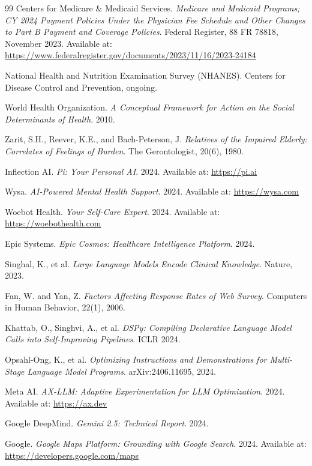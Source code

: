 \documentclass{article}
\begin{document}
\begin{thebibliography}{99}
Centers for Medicare \& Medicaid Services.
\textit{Medicare and Medicaid Programs; CY 2024 Payment Policies Under the Physician Fee Schedule and Other Changes to Part B Payment and Coverage Policies}.
Federal Register, 88 FR 78818, November 2023.
Available at: \url{https://www.federalregister.gov/documents/2023/11/16/2023-24184}

National Health and Nutrition Examination Survey (NHANES).
Centers for Disease Control and Prevention, ongoing.

World Health Organization.
\textit{A Conceptual Framework for Action on the Social Determinants of Health}.
2010.

Zarit, S.H., Reever, K.E., and Bach-Peterson, J.
\textit{Relatives of the Impaired Elderly: Correlates of Feelings of Burden}.
The Gerontologist, 20(6), 1980.

Inflection AI.
\textit{Pi: Your Personal AI}.
2024. Available at: \url{https://pi.ai}

Wysa.
\textit{AI-Powered Mental Health Support}.
2024. Available at: \url{https://wysa.com}

Woebot Health.
\textit{Your Self-Care Expert}.
2024. Available at: \url{https://woebothealth.com}

Epic Systems.
\textit{Epic Cosmos: Healthcare Intelligence Platform}.
2024.

Singhal, K., et al.
\textit{Large Language Models Encode Clinical Knowledge}.
Nature, 2023.

Fan, W. and Yan, Z.
\textit{Factors Affecting Response Rates of Web Survey}.
Computers in Human Behavior, 22(1), 2006.

Khattab, O., Singhvi, A., et al.
\textit{DSPy: Compiling Declarative Language Model Calls into Self-Improving Pipelines}.
ICLR 2024.

Opsahl-Ong, K., et al.
\textit{Optimizing Instructions and Demonstrations for Multi-Stage Language Model Programs}.
arXiv:2406.11695, 2024.

Meta AI.
\textit{AX-LLM: Adaptive Experimentation for LLM Optimization}.
2024. Available at: \url{https://ax.dev}

Google DeepMind.
\textit{Gemini 2.5: Technical Report}.
2024.

Google.
\textit{Google Maps Platform: Grounding with Google Search}.
2024. Available at: \url{https://developers.google.com/maps}


\end{thebibliography}
\end{document}
